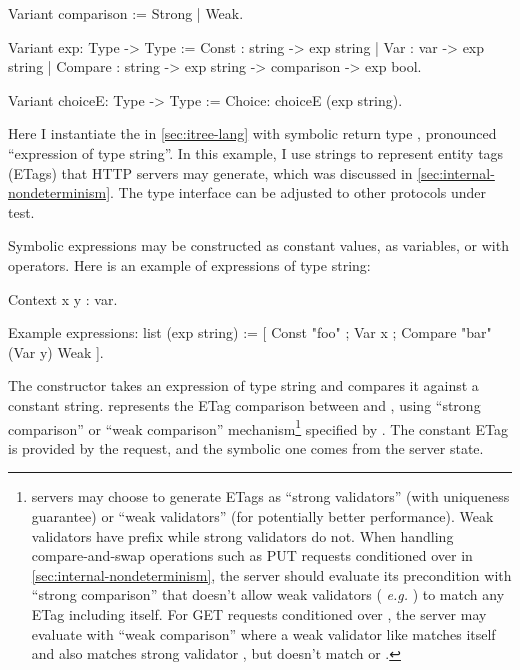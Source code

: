 \begin{coq}
  Variant comparison := Strong | Weak.

  Variant exp: Type -> Type :=
    Const    : string -> exp string
  | Var      : var    -> exp string
  | Compare  : string -> exp string -> comparison -> exp bool.

  Variant choiceE: Type -> Type :=
    Choice: choiceE (exp string).
\end{coq}

Here I instantiate the  in \autoref{sec:itree-lang} with symbolic
return type , pronounced ``expression of type string''.  In
this example, I use strings to represent entity tags (ETags) that HTTP servers
may generate, which was discussed in \autoref{sec:internal-nondeterminism}.  The
type interface can be adjusted to other protocols under test.

Symbolic expressions may be constructed as constant values, as variables, or
with operators.  Here is an example of expressions of type string:
\begin{coq}
  Context x y : var.

  Example expressions: list (exp string) :=
    [ Const   "foo"
    ; Var      x
    ; Compare "bar" (Var y) Weak
    ].
\end{coq}

The  constructor takes an expression of type string and compares it
against a constant string.   represents the ETag
comparison between  and , using ``strong comparison'' or ``weak
comparison'' mechanism\footnote{\http servers may choose to generate ETags as
``strong validators'' (with uniqueness guarantee) or ``weak validators'' (for
potentially better performance).  Weak validators have prefix  while
strong validators do not.  When handling compare-and-swap operations such as PUT
requests conditioned over  in
\autoref{sec:internal-nondeterminism}, the server should evaluate its
precondition with ``strong comparison'' that doesn't allow weak validators ({\it
e.g.} ) to match any ETag including itself.  For GET requests
conditioned over , the server may evaluate with ``weak
comparison'' where a weak validator like  matches itself and
also matches strong validator , but doesn't match 
or .\label{foot:etag}} specified by .  The constant ETag is provided by
the request, and the symbolic one comes from the server state.

